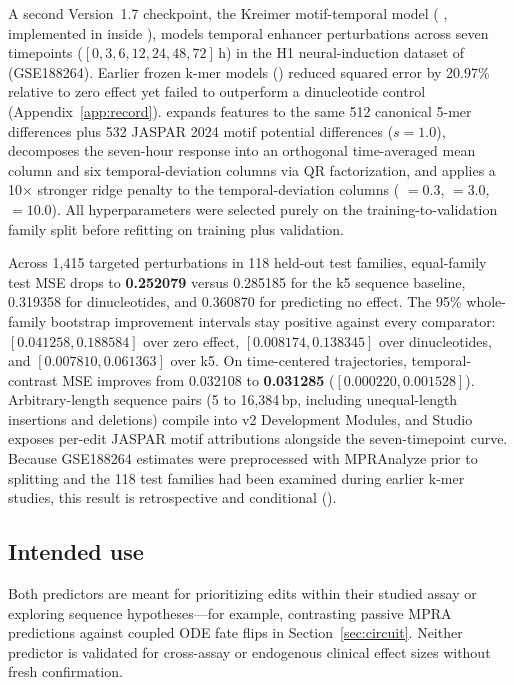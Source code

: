 \documentclass[10.5pt,a4paper]{article}
\begin{document}
A second Version~1.7 checkpoint, the Kreimer motif-temporal model ( , implemented in  inside ), models temporal enhancer perturbations across seven timepoints ($[0, 3, 6, 12, 24, 48, 72]$\,h) in the H1 neural-induction dataset of \citet{kreimer2022} (GSE188264). Earlier frozen k-mer models () reduced squared error by 20.97\% relative to zero effect yet failed to outperform a dinucleotide control (Appendix~\ref{app:record}).  expands features to the same 512 canonical 5-mer differences plus 532 JASPAR 2024 motif potential differences ($s=1.0$), decomposes the seven-hour response into an orthogonal time-averaged mean column and six temporal-deviation columns via QR factorization, and applies a 10$\times$ stronger ridge penalty to the temporal-deviation columns ( $=0.3$,  $=3.0$,  $=10.0$). All hyperparameters were selected purely on the training-to-validation family split before refitting on training plus validation.

Across 1,415 targeted perturbations in 118 held-out test families, equal-family test MSE drops to \textbf{0.252079} versus 0.285185 for the k5 sequence baseline, 0.319358 for dinucleotides, and 0.360870 for predicting no effect. The 95\% whole-family bootstrap improvement intervals stay positive against every comparator: $[0.041258, 0.188584]$ over zero effect, $[0.008174, 0.138345]$ over dinucleotides, and $[0.007810, 0.061363]$ over k5. On time-centered trajectories, temporal-contrast MSE improves from 0.032108 to \textbf{0.031285} ($[0.000220, 0.001528]$). Arbitrary-length sequence pairs (5 to 16,384\,bp, including unequal-length insertions and deletions) compile into  v2 Development Modules, and Studio exposes per-edit JASPAR motif attributions alongside the seven-timepoint curve. Because GSE188264 estimates were preprocessed with MPRAnalyze prior to splitting and the 118 test families had been examined during earlier k-mer studies, this result is retrospective and conditional ().

\subsection{Intended use}

Both predictors are meant for prioritizing edits within their studied assay or exploring sequence hypotheses—for example, contrasting passive MPRA predictions against coupled ODE fate flips in Section~\ref{sec:circuit}. Neither predictor is validated for cross-assay or endogenous clinical effect sizes without fresh confirmation.
\end{document}
